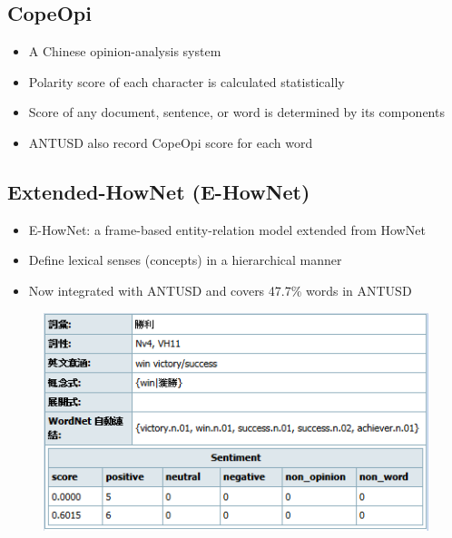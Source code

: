 \documentclass[compress]{beamer}
\begin{document}
    \subsection{CopeOpi}
        \begin{frame}{\subsecname}
            \begin{itemize}
                \item A Chinese opinion-analysis system %
                \item Polarity score of each character is calculated statistically %
                \item Score of any document, sentence, or word is determined by its components
                \item ANTUSD also record CopeOpi score for each word
            \end{itemize}
        \end{frame}

    \subsection{Extended-HowNet (E-HowNet)}
        \begin{frame}{\subsecname}
            \begin{itemize}
                \item E-HowNet: a frame-based entity-relation model extended from HowNet %
                \item Define lexical senses (concepts) in a hierarchical manner
                \item Now integrated with ANTUSD and covers 47.7\% words in ANTUSD
            \end{itemize}
            \begin{figure}
                \includegraphics[scale=0.55,center]{e-hownet.png}
            \end{figure}
        \end{frame}
\end{document}
